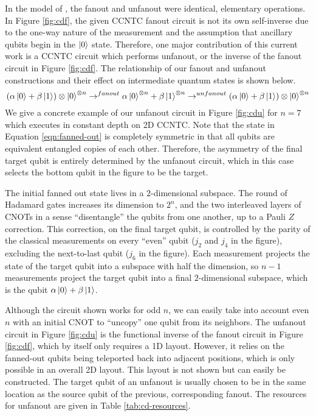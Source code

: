 In the model of \cite{Hoyer2002}, the fanout and unfanout were identical, elementary
operations. In Figure \ref{fig:cdf}, the given CCNTC fanout circuit is not its own self-inverse
due to
the one-way nature of the measurement and the assumption that ancillary qubits begin in the
$\left\vert{0}\right\rangle$ state. Therefore, one major contribution of this current work is
a \textsc{CCNTC} circuit which performs unfanout, or the inverse of the fanout circuit in
Figure \ref{fig:cdf}. The relationship of our fanout and unfanout constructions and their
effect on intermediate quantum states is shown below.
\begin{equation}
(\alpha\left\vert{0}\right\rangle + \beta\left\vert{1}\right\rangle)\otimes\left\vert{0}\right\rangle^{\otimes n} \rightarrow^{fanout}
\alpha\left\vert{0}\right\rangle^{\otimes n} + \beta\left\vert{1}\right\rangle^{\otimes n} \rightarrow^{unfanout}
(\alpha\left\vert{0}\right\rangle + \beta\left\vert{1}\right\rangle)\otimes\left\vert{0}\right\rangle^{\otimes n}
\end{equation}
We give a concrete example of our unfanout circuit in Figure \ref{fig:cdu}
for $n=7$ which executes in constant depth on \textsf{2D CCNTC}.
Note that the state in Equation \ref{eqn:fanned-out}
is completely symmetric in that all qubits are
equivalent entangled copies of each other. Therefore, the asymmetry 
of the final target qubit is entirely determined by the unfanout circuit,
which in this case selects the bottom qubit in the figure to be the target.

The initial fanned out state lives in a $2$-dimensional subspace. The
round of Hadamard gates increases its dimension to $2^n$, and the two
interleaved layers of CNOTs in a sense ``disentangle'' the qubits from
one another, up to a Pauli $Z$ correction. This correction, on the
final target qubit, is controlled by the parity of the classical measurements
on every ``even'' qubit ($j_2$ and $j_4$ in the figure), excluding the 
next-to-last qubit ($j_6$ in the figure). Each measurement projects the state of the
target qubit
into a subspace with half the dimension, so $n-1$ measurements project
the target qubit into a final $2$-dimensional subspace, which is the
qubit $\alpha\left\vert{0}\right\rangle + \beta\left\vert{1}\right\rangle$.

Although the circuit shown works for odd $n$, we can easily take into
account even $n$ with an initial CNOT to ``uncopy'' one qubit from its
neighbors. The unfanout circuit in Figure \ref{fig:cdu} is the
functional inverse of the fanout circuit in 
Figure \ref{fig:cdf}, which by itself only requires a 1D layout. However,
it relies on the fanned-out qubits
being teleported back into adjacent positions,
which is only possible in an overall 2D layout. This layout is not shown but can easily be constructed.
The target qubit of an unfanout is usually chosen to be in the same location
as the source qubit of the previous, corresponding fanout. 
The resources for unfanout are given in
Table \ref{tab:cd-resources}.

